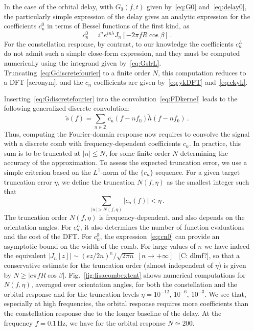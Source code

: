 \documentclass[aps,showpacs,twocolumn,
prd,superscriptaddress,nofootinbib]{revtex4-1}
\newcommand{\be}{\begin{equation}}
\newcommand{\ee}{\end{equation}}
\newcommand{\Hz}{\,\mathrm{Hz}}
\newcommand{\SM}[1]{{\color{Red} #1}}
\begin{document}
In the case of the orbital delay, with $G_{0}(f,t)$ given by~\eqref{eq:G0} and~\eqref{eq:delay0}, the particularly simple expression of the delay gives an analytic expression for the coefficients $c_{n}^{0}$ in terms of Bessel functions of the first kind, as
\be\label{eq:cn0}
	c_{n}^{0} = i^{n} e^{i n \lambda} J_{n} \left[ -2 \pi f R \cos \beta \right]\,.
\ee
For the constellation response, by contrast, to our knowledge the coefficients $c_{n}^{L}$ do not admit such a simple close-form expression, and they must be computed numerically using the integrand given by~\eqref{eq:GslrL}. Truncating~\eqref{eq:Gdiscretefourier} to a finite order $N$, this computation reduces to a DFT \SM{[acronym]}, and the $c_{n}$ coefficients are given by~\eqref{eq:ykDFT} and~\eqref{eq:ckyk}. 

Inserting~\eqref{eq:Gdiscretefourier} into the convolution~\eqref{eq:FDkernel} leads to the following generalized discrete convolution:
\be\label{eq:transferdiscreteconvolution}
	\tilde{s}(f) = \sum_{n \in \mathbb{Z}} c_{n}(f - n f_{0}) \tilde{h} (f - n f_{0}) \,.
\ee
Thus, computing the Fourier-domain response now requires to convolve the signal with a discrete comb with frequency-dependent coefficients $c_{n}$. In practice, this sum is to be truncated at $|n|\leq N$, for some finite order $N$ determining the accuracy of the approximation. To assess the expected truncation error, we use a simple criterion based on the $L^{1}$-norm of the $\{c_{n}\}$ sequence. For a given target truncation error $\eta$, we define the truncation $N(f, \eta)$ as the smallest integer such that 
\be\label{eq:criteriontruncationcomb}
	\sum_{|n| > N(f, \eta)} |c_{n}(f)| < \eta \,.
\ee
The truncation order $N(f,\eta)$ is frequency-dependent, and also depends on the orientation angles. For $c_{n}^{L}$, it also determines the number of function evaluations and the cost of the DFT. For $c_{n}^{0}$, the expression~\eqref{eq:cn0} can provide an asymptotic bound on the width of the comb. For large values of $n$ we have indeed the equivalent $| J_{n}[z] | \sim (e z/2n)^{n}/\sqrt{2\pi n} \; \left[ n\rightarrow + \infty \right]$~\cite{} \SM{[C: dlmf?]}, so that a conservative estimate for the truncation order (almost independent of $\eta$) is given by $N \geq  |e \pi f R \cos \beta|$. Fig.~\ref{fig:lisacombextent} shows numerical computations for $N(f,\eta)$, averaged over orientation angles, for both the constellation and the orbital response and for the truncation levels  $\eta=10^{-12}$, $10^{-6}$, $10^{-3}$. We see that, especially at high frequencies, the orbital response requires more coefficients than the constellation response due to the longer baseline of the delay. At the frequency $f=0.1\Hz$, we have for the orbital response $N \simeq 200$.
\end{document}
